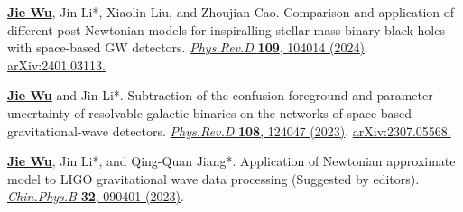 \begin{cvpublications}
\begin{pubitems}
\item \textbf{\underline{Jie Wu}}, Jin Li*, Xiaolin Liu, and Zhoujian Cao. Comparison and application of different post-Newtonian models for inspiralling stellar-mass binary black holes with space-based GW detectors. \href{https://journals.aps.org/prd/abstract/10.1103/PhysRevD.109.104014}{\textit{Phys.Rev.D} \textbf{109}, 104014 (2024)}. \href{https://arxiv.org/abs/2401.03113}{arXiv:2401.03113.}

\item \textbf{\underline{Jie Wu}} and Jin Li*. Subtraction of the confusion foreground and parameter uncertainty of resolvable galactic binaries on the networks of space-based gravitational-wave detectors. \href{https://journals.aps.org/prd/abstract/10.1103/PhysRevD.108.124047}{\textit{Phys.Rev.D} \textbf{108}, 124047 (2023)}. \href{https://arxiv.org/abs/2307.05568}{arXiv:2307.05568.}

\item \textbf{\underline{Jie Wu}}, Jin Li*, and Qing-Quan Jiang*. Application of Newtonian approximate model to LIGO gravitational wave data processing (Suggested by editors). \href{https://cpb.iphy.ac.cn/EN/10.1088/1674-1056/acd8a3}{\textit{Chin.Phys.B} \textbf{32}, 090401 (2023)}.
\end{pubitems}
\end{cvpublications}


